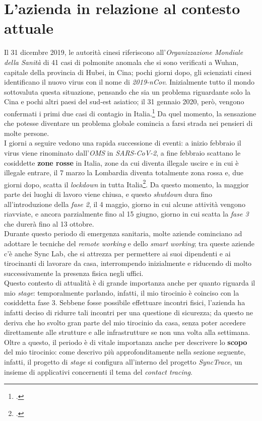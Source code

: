 
\section{L'azienda in relazione al contesto attuale}

Il 31 dicembre 2019, le autorità cinesi riferiscono all'\textit{Organizzazione Mondiale della Sanità} di 41 casi di polmonite anomala che si sono verificati a Wuhan, capitale della provincia di Hubei, in Cina; pochi giorni dopo, gli scienziati cinesi identificano il nuovo virus con il nome di \textit{2019-nCov}. Inizialmente tutto il mondo sottovaluta questa situazione, pensando che sia un problema riguardante solo la Cina e pochi altri paesi del sud-est asiatico; il 31 gennaio 2020, però, vengono confermati i primi due casi di contagio in Italia.\footcite{sole24ore:cronistoria-covid} Da quel momento, la sensazione che potesse diventare un problema globale comincia a farsi strada nei pensieri di molte persone. \\
I giorni a seguire vedono una rapida successione di eventi: a inizio febbraio il virus viene rinominato dall'\textit{OMS} in \textit{SARS-CoV-2}, a fine febbraio scattano le cosiddette \textbf{zone rosse} in Italia, zone da cui diventa illegale uscire e in cui è illegale entrare, il 7 marzo la Lombardia diventa totalmente zona rossa e, due giorni dopo, scatta il \textit{lockdown} in tutta Italia\footcite{sole24ore:cronistoria-covid}. Da questo momento, la maggior parte dei luoghi di lavoro viene chiusa, e questo \textit{shutdown} dura fino all'introduzione della \textit{fase 2}, il 4 maggio, giorno in cui alcune attività vengono riavviate, e ancora parzialmente fino al 15 giugno, giorno in cui scatta la \textit{fase 3} che durerà fino al 13 ottobre. \\

Durante questo periodo di emergenza sanitaria, molte aziende cominciano ad adottare le tecniche del \textit{remote working} e dello \textit{smart working}; tra queste aziende c'è anche Sync Lab, che si attrezza per permettere ai suoi dipendenti e ai tirocinanti di lavorare da casa, interrompendo inizialmente e riducendo di molto successivamente la presenza fisica negli uffici. \\
Questo contesto di attualità è di grande importanza anche per quanto riguarda il mio \textit{stage}: temporalmente parlando, infatti, il mio tirocinio è coinciso con la cosiddetta fase 3. Sebbene fosse possibile effettuare incontri fisici, l'azienda ha infatti deciso di ridurre tali incontri per una questione di sicurezza; da questo ne deriva che ho svolto gran parte del mio tirocinio da casa, senza poter accedere direttamente alle strutture e alle infrastrutture se non una volta alla settimana. \\
Oltre a questo, il periodo è di vitale importanza anche per descrivere lo \textbf{scopo} del mio tirocinio: come descrivo più approfonditamente nella sezione seguente, infatti, il progetto di \textit{stage} si configura all'interno del progetto \textit{SyncTrace}, un insieme di applicativi concernenti il tema del \textit{contact tracing}.

